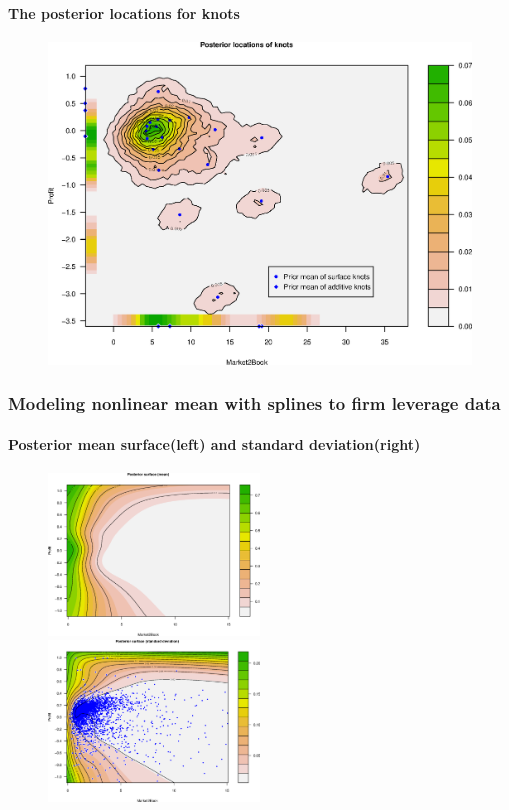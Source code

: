 \documentclass[10pt]{beamer}
\begin{document}
\begin{frame}[plain]
  \framesubtitle{The posterior locations for knots}
  \begin{center}
    \begin{figure}
      \includegraphics[height=\textheight]{RajanPostKnots.eps}
    \end{figure}
  \end{center}
\end{frame}

\begin{frame}
  \frametitle{Modeling nonlinear mean with splines to firm leverage data}
  \framesubtitle{Posterior mean surface(left) and standard deviation(right)}
  \begin{center}
    \begin{figure}
      \includegraphics[width=0.5\textwidth]{RajanPostMean.eps}~~~\includegraphics[width=0.5\textwidth]{RajanPostSD.eps}
    \end{figure}
  \end{center}
\end{frame}
\end{document}
